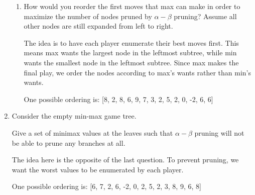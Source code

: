 \documentclass[12pt,letterpaper]{article}
\begin{document}
\begin{enumerate}
\begin{enumerate}
        \item
          How would you reorder the first moves that max can make
          in order to maximize the number of nodes pruned by $\alpha-\beta$ pruning?
          Assume all other nodes are still expanded from left to right.

          The idea is to have each player enumerate their best moves first.
          This means max wants the largest node in the leftmost subtree,
          while min wants the smallest node in the leftmost subtree.
          Since max makes the final play, we order the nodes according to max's wants rather than min's wants.

          One possible ordering is: [8, 2, 8, 6, 9, 7, 3, 2, 5, 2, 0, -2, 6, 6]
      \end{enumerate}

    \item
      Consider the empty min-max game tree.

      Give a set of minimax values at the leaves such that
      $\alpha-\beta$ pruning will not be able to prune any branches at all.

      The idea here is the opposite of the last question.
      To prevent pruning, we want the worst values to be enumerated by each player.

      One possible ordering is: [6, 7, 2, 6, -2, 0, 2, 5, 2, 3, 8, 9, 6, 8]
  \end{enumerate}
\end{document}
